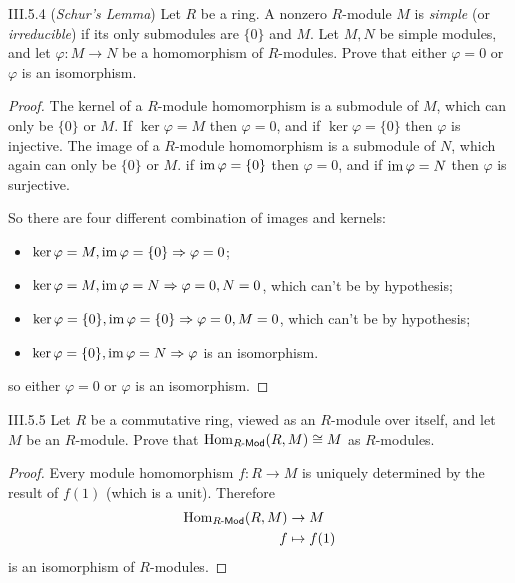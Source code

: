 \begin{problem}{III.5.4} (\emph{Schur's Lemma})
Let $R$ be a ring. A nonzero $R$-module $M$ is \emph{simple} (or \emph{irreducible}) if its only
submodules are $\{0\}$ and $M$. Let $M, N$ be simple modules, and let $\varphi: M \to N$ be
a homomorphism of $R$-modules. Prove that either $\varphi = 0$ or $\varphi$ is an isomorphism.
\end{problem}
\begin{proof}
The kernel of a $R$-module homomorphism is a submodule of $M$, which can only be $\{0\}$ or $M$. If $\ker \varphi = M$ then $\varphi = 0$, and if $\ker \varphi = \{0\}$ then $\varphi$ is injective. The image of a $R$-module homomorphism is a submodule of $N$, which again can only be $\{0\}$ or $M$. if $\operatorname{im} \varphi = \{0\}$ then $\varphi = 0$, and if $\operatorname{im} \varphi = N$ then $\varphi$ is surjective.

So there are four different combination of images and kernels:
\begin{itemize}
    \setlength\itemsep{0pt}
    \item $\ker \varphi = M, \operatorname{im} \varphi = \{0\} \Rightarrow \varphi = 0$;
    \item $\ker \varphi = M, \operatorname{im} \varphi = N \Rightarrow \varphi = 0, N = 0$, which can't be by hypothesis;
    \item $\ker \varphi = \{0\}, \operatorname{im} \varphi = \{0\} \Rightarrow \varphi = 0, M = 0$, which can't be by hypothesis;
    \item $\ker \varphi = \{0\}, \operatorname{im} \varphi = N \Rightarrow \varphi$ is an isomorphism.
\end{itemize}
so either $\varphi = 0$ or $\varphi$ is an isomorphism.
\end{proof}

\begin{problem}{III.5.5}
Let $R$ be a commutative ring, viewed as an $R$-module over itself, and let $M$ be an $R$-module. Prove that $\operatorname{Hom}_{R\textsf{-Mod}}(R,M) \cong M$ as $R$-modules.
\end{problem}
\begin{proof}
Every module homomorphism $f: R \to M$ is uniquely determined by the result of $f(1)$ (which is a unit). Therefore
\begin{align*}
    \operatorname{Hom}_{R\textsf{-Mod}}(R,M) &\to M \\
    f &\mapsto f(1)
\end{align*}
is an isomorphism of $R$-modules.
\end{proof}

